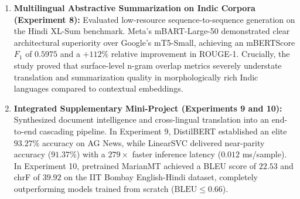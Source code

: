 \begin{enumerate}
    \item \textbf{Multilingual Abstractive Summarization on Indic Corpora (Experiment 8):} Evaluated low-resource sequence-to-sequence generation on the Hindi XL-Sum benchmark. Meta's mBART-Large-50 demonstrated clear architectural superiority over Google's mT5-Small, achieving an mBERTScore $F_1$ of $\mathbf{0.5975}$ and a $+112\%$ relative improvement in ROUGE-1. Crucially, the study proved that surface-level n-gram overlap metrics severely understate translation and summarization quality in morphologically rich Indic languages compared to contextual embeddings.
    \item \textbf{Integrated Supplementary Mini-Project (Experiments 9 and 10):} Synthesized document intelligence and cross-lingual translation into an end-to-end cascading pipeline. In Experiment 9, DistilBERT established an elite $\mathbf{93.27\%}$ accuracy on AG News, while LinearSVC delivered near-parity accuracy ($\mathbf{91.37\%}$) with a $279\times$ faster inference latency ($0.012$ ms/sample). In Experiment 10, pretrained MarianMT achieved a BLEU score of $\mathbf{22.53}$ and chrF of $\mathbf{39.92}$ on the IIT Bombay English-Hindi dataset, completely outperforming models trained from scratch ($\text{BLEU} \le 0.66$).
\end{enumerate}

